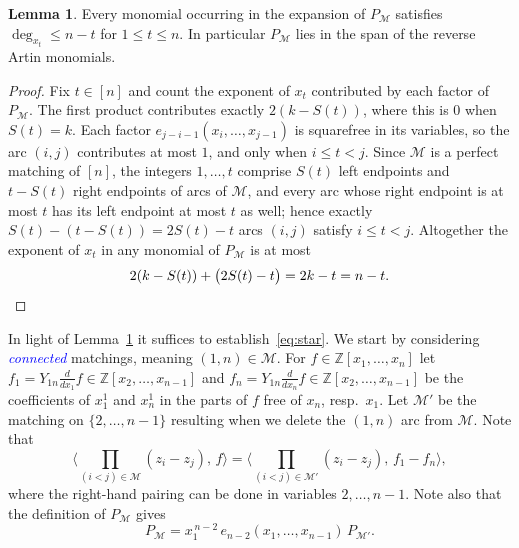 \documentclass[11pt]{amsart}
\theoremstyle{definition}
\newtheorem{lem}[thm]{Lemma}
\numberwithin{equation}{section}
\renewcommand\emph[1]{\textcolor{blue}{\textit{#1}}} %
\begin{document}
\begin{lem}\label{lem:revArtinMembership}
Every monomial occurring in the expansion of $P_{\mathcal{M}}$ satisfies $\deg_{x_t}\le n-t$ for $1\le t\le n$. In particular $P_{\mathcal{M}}$ lies in the span of the reverse Artin monomials.
\end{lem}
\begin{proof}
Fix $t\in [n]$ and count the exponent of $x_t$ contributed by each factor of $P_{\mathcal{M}}$. The first product contributes exactly $2(k-S(t))$, where this is $0$ when $S(t)=k$. Each factor $e_{j-i-1}(x_i,\ldots,x_{j-1})$ is squarefree in its variables, so the arc $(i,j)$ contributes at most $1$, and only when $i\le t<j$. Since $\mathcal{M}$ is a perfect matching of $[n]$, the integers $1,\ldots,t$ comprise $S(t)$ left endpoints and $t-S(t)$ right endpoints of arcs of $\mathcal{M}$, and every arc whose right endpoint is at most $t$ has its left endpoint at most $t$ as well; hence exactly $S(t)-(t-S(t))=2S(t)-t$ arcs $(i,j)$ satisfy $i\le t<j$. Altogether the exponent of $x_t$ in any monomial of $P_{\mathcal{M}}$ is at most
$$2(k-S(t))+\big(2S(t)-t\big)=2k-t=n-t.\qedhere$$
\end{proof}
In light of Lemma~\ref{lem:revArtinMembership} it suffices to establish~\eqref{eq:star}.
We start by considering \emph{connected} matchings, meaning $(1,n)\in \mathcal{M}$.
For $f\in\mathbb{Z}[x_1,\dots,x_n]$ let $f_1=Y_{1n}\frac{d}{dx_1}f\in \mathbb{Z}[x_2,\ldots,x_{n-1}]$ and $f_n=Y_{1n}\frac{d}{dx_n}f\in \mathbb{Z}[x_2,\ldots,x_{n-1}]$ be the coefficients of $x_1^1$ and $x_n^1$ in
the parts of $f$ free of $x_n$, resp.\ $x_1$. Let $\mathcal{M}'$ be the matching on $\{2,\dots,n-1\}$ resulting when we delete the $(1,n)$ arc from $\mathcal{M}$.
Note that
\begin{equation}
\label{eqn:remove1n} \big\langle\prod_{(i<j)\in \mathcal{M}}(z_i-z_j),\,f\big\rangle=\big\langle \prod_{(i<j)\in \mathcal{M}'}(z_i-z_j),\,f_1-f_n\big\rangle,
\end{equation}
where the right-hand pairing can be done in variables $2,\ldots,n-1$.
Note also that the definition of $P_{\mathcal{M}}$ gives
\begin{equation}\label{eqn:MtoM'}
  P_{\mathcal{M}}=x_1^{\,n-2}\,e_{n-2}(x_1,\dots,x_{n-1})\,P_{\mathcal{M}'} .
\end{equation}
\end{document}
